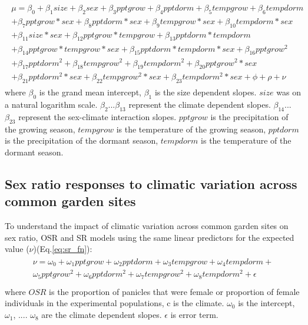\documentclass[12pt]{article}\usepackage[]{graphicx}\usepackage[dvipsnames]{xcolor}
\begin{document}
\begin{align}\label{eq:mu}
\begin{split}
\mu = \beta_{0} + \beta_{1}size + \beta_{2}sex + \beta_{3}pptgrow + \beta_{4}pptdorm + \beta_{5}tempgrow + \beta_{6}tempdorm \\ 
+ \beta_{7}pptgrow*sex + \beta_{8}pptdorm*sex + \beta_{9}tempgrow*sex + \beta_{10}tempdorm*sex  \\ 
+  \beta_{11}size*sex + \beta_{12}pptgrow*tempgrow + \beta_{13}pptdorm*tempdorm\\
+ \beta_{14}pptgrow*tempgrow*sex + \beta_{15}pptdorm*tempdorm*sex + \beta_{16}pptgrow^2\\
+ \beta_{17}pptdorm^2 + \beta_{18}tempgrow^2 + \beta_{19}tempdorm^2 + \beta_{20}pptgrow^2*sex  \\
+ \beta_{21}pptdorm^2*sex + \beta_{22}tempgrow^2*sex + \beta_{23}tempdorm^2*sex + \phi + \rho + \nu 
\end{split}
\end{align}
\noindent where $\beta_{0}$ is the  grand mean intercept, $\beta_{1}$ is the size dependent slopes.
$size$ was on a natural logarithm scale. 
$\beta_{2}$...$\beta_{13}$ represent the climate dependent slopes.
$\beta_{14}$...$\beta_{23}$ represent the sex-climate interaction slopes.
$pptgrow$ is the precipitation of the growing season, $tempgrow$ is the temperature of the growing season, $pptdorm$ is the precipitation of the dormant season, $tempdorm$ is the temperature of the dormant season.

\subsection{Sex ratio responses to climatic variation across common garden sites} \label {sssec:sexratio_bayesian}
To understand the impact of climatic variation across common garden sites on sex ratio, OSR and SR  models using  the same linear predictors for the expected value ($\nu$)(Eq.\ref{eq:sr_fn}):
\begin{align}\label{eq:sr_fn}
\begin{split}
	\nu =   \omega_{0}+ \omega_{1}pptgrow + \omega_{2}pptdorm + \omega_{3}tempgrow + \omega_{4}tempdorm + \\
	  \omega_{5}pptgrow^2 + \omega_{6}pptdorm^2 + \omega_{7}tempgrow^2 + \omega_{8}tempdorm^2 + \epsilon\\
\end{split}
\end{align}
\noindent where $OSR$ is the proportion of panicles that were female or proportion of female individuals in the experimental populations, c is the climate. 
$\omega_{0}$ is the intercept, $\omega_{1}$, .... $\omega_{8}$ are the climate dependent slopes. $\epsilon$ is error term.
\end{document}

